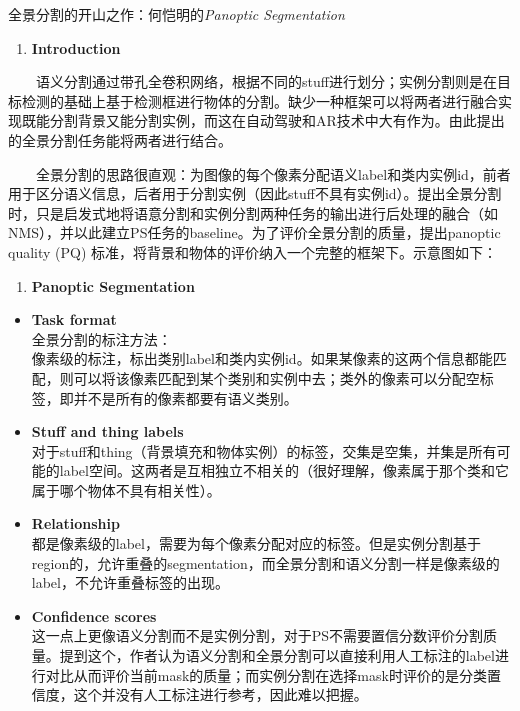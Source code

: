 全景分割的开山之作：何恺明的\emph{Panoptic Segmentation}

\begin{enumerate}
\def\labelenumi{\arabic{enumi}.}
\item
  \textbf{Introduction}
\end{enumerate}

  语义分割通过带孔全卷积网络，根据不同的stuff进行划分；实例分割则是在目标检测的基础上基于检测框进行物体的分割。缺少一种框架可以将两者进行融合实现既能分割背景又能分割实例，而这在自动驾驶和AR技术中大有作为。由此提出的全景分割任务能将两者进行结合。

  全景分割的思路很直观：为图像的每个像素分配语义label和类内实例id，前者用于区分语义信息，后者用于分割实例（因此stuff不具有实例id）。提出全景分割时，只是启发式地将语意分割和实例分割两种任务的输出进行后处理的融合（如NMS），并以此建立PS任务的baseline。为了评价全景分割的质量，提出panoptic
quality (PQ) 标准，将背景和物体的评价纳入一个完整的框架下。示意图如下：

\begin{enumerate}
\def\labelenumi{\arabic{enumi}.}
\setcounter{enumi}{1}
\item
  \textbf{Panoptic Segmentation}
\end{enumerate}

\begin{itemize}
\item
  \textbf{Task format}\\
  全景分割的标注方法：\\
  像素级的标注，标出类别label和类内实例id。如果某像素的这两个信息都能匹配，则可以将该像素匹配到某个类别和实例中去；类外的像素可以分配空标签，即并不是所有的像素都要有语义类别。
\item
  \textbf{Stuff and thing labels}\\
  对于stuff和thing（背景填充和物体实例）的标签，交集是空集，并集是所有可能的label空间。这两者是互相独立不相关的（很好理解，像素属于那个类和它属于哪个物体不具有相关性）。
\item
  \textbf{Relationship}\\
  都是像素级的label，需要为每个像素分配对应的标签。但是实例分割基于region的，允许重叠的segmentation，而全景分割和语义分割一样是像素级的label，不允许重叠标签的出现。
\item
  \textbf{Confidence scores}\\
  这一点上更像语义分割而不是实例分割，对于PS不需要置信分数评价分割质量。提到这个，作者认为语义分割和全景分割可以直接利用人工标注的label进行对比从而评价当前mask的质量；而实例分割在选择mask时评价的是分类置信度，这个并没有人工标注进行参考，因此难以把握。
\end{itemize}

